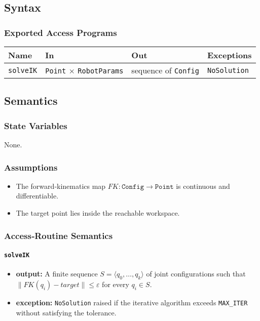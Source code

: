 \documentclass[12pt, titlepage]{article}
\begin{document}
\subsection{Syntax}
\subsubsection{Exported Access Programs}
\begin{center}
\renewcommand{\arraystretch}{1.3}
\begin{tabular}{p{3.2cm} p{6cm} p{3cm} p{3cm}}
\toprule
\textbf{Name} & \textbf{In} & \textbf{Out} & \textbf{Exceptions}\\ \midrule
\texttt{solveIK} & \texttt{Point} $\times$ \texttt{RobotParams} & sequence of \texttt{Config} & \texttt{NoSolution}\\
\bottomrule
\end{tabular}
\end{center}

\subsection{Semantics}
\subsubsection{State Variables}
None.

\subsubsection{Assumptions}
\begin{itemize}
  \item The forward‑kinematics map $FK:\texttt{Config}\rightarrow\texttt{Point}$ is continuous and differentiable.
  \item The target point lies inside the reachable workspace.
\end{itemize}

\subsubsection{Access‑Routine Semantics}

\paragraph{\texttt{solveIK}}
\begin{itemize}
  \item \textbf{output:} A finite sequence $S=\langle q_0,\dots,q_k\rangle$ of joint configurations such that
        $\|FK(q_i)-\textit{target}\|\le \varepsilon$ for every $q_i\in S$.
  \item \textbf{exception:} \texttt{NoSolution} raised if the iterative algorithm exceeds
        \texttt{MAX\_ITER} without satisfying the tolerance.
\end{itemize}
\end{document}
